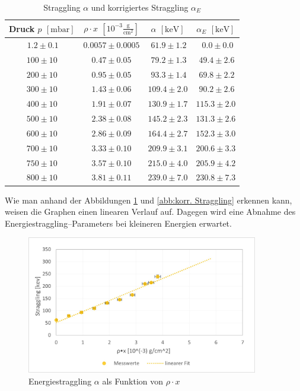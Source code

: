 \documentclass[12pt,a4paper]{scrartcl}
\numberwithin{equation}{section} %
\begin{document}
\begin{table}
	\centering
	\begin{tabular}[h]{||c|c|c|c||}
		\hline
		Druck $p$ $[\mathrm{mbar}]$
			& $\rho \cdot x$ $\left[10^{-3} \mathrm{\frac{g}{cm^2}}\right]$
			& $\alpha$ $[\mathrm{keV}]$ & $\alpha _E$ $[\mathrm{keV}]$\\
		\hline\hline
		$\ 1.2 \pm 0.1$ & $0.0057 \pm 0.0005$ & $\ 61.9 \pm 1.2$ & $\ \ 0.0 \pm 0.0$\\
		\hline
		$100 \pm 10$ & $0.47 \pm 0.05$ & $\ 79.2 \pm 1.3$ & $\ 49.4 \pm 2.6$  \\
		\hline
		$200 \pm 10$ & $0.95 \pm 0.05$ & $\ 93.3 \pm 1.4$ & $\ 69.8 \pm 2.2 $ \\
		\hline
		$300 \pm 10$ & $1.43 \pm 0.06$ & $109.4 \pm 2.0$ & $\ 90.2 \pm 2.6$\\
		\hline
		$400 \pm 10$ & $1.91 \pm 0.07$ & $130.9 \pm 1.7$ & $115.3 \pm 2.0$ \\
		\hline
		$500 \pm 10$ & $2.38 \pm 0.08$ & $145.2 \pm 2.3$ & $131.3 \pm 2.6$\\
		\hline
		$600 \pm 10$ & $2.86 \pm 0.09$ & $164.4 \pm 2.7$ & $152.3 \pm 3.0$ \\
		\hline
		$700 \pm 10$ & $3.33 \pm 0.10$ & $209.9 \pm 3.1$ & $200.6 \pm 3.3$ \\
		\hline
		$750 \pm 10$ & $3.57 \pm 0.10$ & $215.0 \pm 4.0$ & $205.9 \pm 4.2$\\
		\hline
		$800 \pm 10$ & $3.81 \pm 0.11$ & $239.0 \pm 7.0$ & $230.8 \pm 7.3$\\
		\hline
	\end{tabular}
	\caption{Straggling $\alpha$ und korrigiertes Straggling $\alpha_E$}
	\label{tabelle:korr. Straggling}
\end{table}

\noindent
Wie man anhand der Abbildungen \ref{abb:Straggling} und \ref{abb:korr. Straggling}  erkennen kann, weisen die Graphen einen linearen Verlauf auf. Dagegen wird eine Abnahme des Energiestraggling--Parameters bei kleineren Energien erwartet. \cite{Prior}

\begin{figure}[h]
	\centering
	\includegraphics[width=0.9\textwidth]{../media/B3.3/Straggling.jpg}
	\caption{Energiestraggling $\alpha$ als Funktion von $\rho \cdot x$}
	\label{abb:Straggling}
\end{figure}
\end{document}
